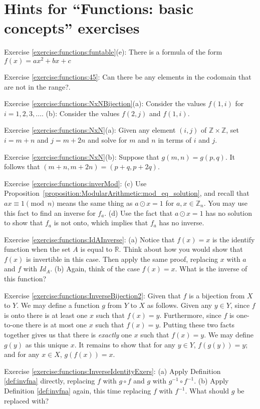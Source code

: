 \section{Hints for ``Functions: basic concepts'' exercises}
\label{sec:Functions:Hints}

\noindent Exercise \ref{exercise:functions:funtable}(e): There is a formula of the form $f(x) = ax^2 + bx + c$

\noindent Exercise \ref{exercise:functions:45}: Can there be any elements in the codomain that are not in the range?.

\noindent Exercise \ref{exercise:functions:NxNBijection}(a): Consider the values $f(1,i)$  for $i=1,2,3,\ldots$. (b): Consider  the values $f(2,j)$ and $f(1,i)$.

\noindent Exercise \ref{exercise:functions:NxN}(a): Given any element $(i,j)$ of $\mathbb{Z} \times \mathbb{Z}$, set $i=m+n$ and $j=m+2n$ and solve for $m$ and $n$ in terms of $i$ and $j$.

\noindent Exercise \ref{exercise:functions:NxN}(b): Suppose that $g(m,n) = g(p,q)$. It follows that $(m + n, m + 2n) = (p + q, p + 2q)$. %

\noindent Exercise \ref{exercise:functions:inverMod}: (c) 
Use Proposition~\ref{proposition:ModularArithmetic:mod_eq_solution}, and recall that $ax \equiv 1 \pmod{n}$ means the same thing as $a \odot x = 1$ for $a,x \in \mathbb{Z}_n$.  You may use this fact to find an inverse for $f_a$. (d) Use the fact that $a \odot x = 1$ has no solution to  show that $f_a$ is not onto, which implies that $f_a$ has no inverse.

\noindent Exercise \ref{exercise:functions:IdAInverse}: (a) Notice that $f(x)=x$ is the identify function when the set $A$ is equal to $\mathbb{R}$.  Think about how you would show that $f(x)$ is invertible in this case.  Then apply the same proof, replacing $x$ with $a$ and $f$ with
$Id_A$.  (b) Again, think of the case $f(x)=x$.  What is the inverse of this function? 

\noindent Exercise \ref{exercise:functions:InverseBijection2}: Given that $f$ is a bijection from $X$ to $Y$. We may define a function $g$ from $Y$ to $X$ as follows.  Given any $y \in Y$, since $f$ is onto there is at least one $x$ such that $f(x) = y$. Furthermore, since $f$ is one-to-one there is at most one $x$ such that $f(x)=y$. Putting these two facts together gives us that there is \emph{exactly} one $x$ such that $f(x)=y$.  We may define $g(y)$ as this unique $x$. It remains to show that for any $y \in Y$, $f(g(y))=y$; and for any $x \in X$, $g(f(x))=x$.

\noindent Exercise \ref{exercise:functions:InverseIdentityExers}: (a) Apply Definition  \ref{def:invfna} directly, replacing $f$ with
$g \circ f$ and $g$ with $g^{-1} \circ f^{-1}$. (b) Apply Definition  \ref{def:invfna} again, this time replacing $f$ with
$f^{-1}$. What should $g$ be replaced with?

